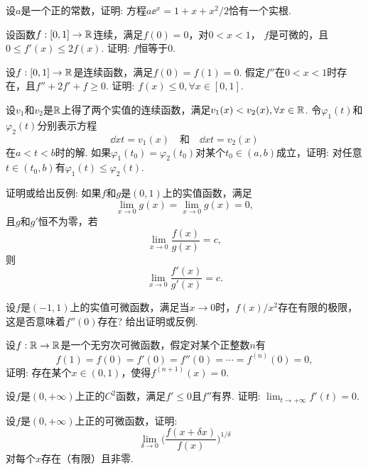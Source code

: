 \begin{example}
  设$a$是一个正的常数，证明: 方程$a\ee^x=1+x+x^2/2$恰有一个实根.
\end{example}

\begin{example}
  设函数$f:[0,1]\to\mathbb R$连续，满足$f(0)=0$，对$0<x<1$， $f$是可微的，且$0\le f'(x)\le2f(x)$. 证明: $f$恒等于0.
\end{example}

\begin{example}
  设$f:[0,1]\to\mathbb R$是连续函数，满足$f(0)=f(1)=0$. 假定$f''$在$0<x<1$时存在，且$f''+2f'+f\ge0$. 证明: $f(x)\le0,\forall x\in[0,1]$.
\end{example}

\begin{example}
  设$v_1$和$v_2$是$\mathbb R$上得了两个实值的连续函数，满足$v_1(x)<v_2(x),\forall x\in\mathbb R$. 令$\varphi_1(t)$和$\varphi_2(t)$分别表示方程
  \[ \dd xt=v_1(x)\quad \text{和}\quad \dd xt=v_2(x) \]
  在$a<t<b$时的解. 如果$\varphi_1(t_0)=\varphi_2(t_0)$对某个$t_0\in(a,b)$成立，证明: 对任意$t\in(t_0,b)$有$\varphi_1(t)\le\varphi_2(t)$.
\end{example}

\begin{example}
  证明或给出反例: 如果$f$和$g$是$(0,1)$上的实值函数，满足
  \[ \lim_{x\to0}g(x) = \lim_{x\to0}g(x)=0, \]
  且$g$和$g'$恒不为零，若
  \[ \lim_{x\to0}\frac{f(x)}{g(x)}=c, \]
  则
  \[ \lim_{x\to0}\frac{f'(x)}{g'(x)}=c. \]
\end{example}

\begin{example}
  设$f$是$(-1,1)$上的实值可微函数，满足当$x\to0$时，$f(x)/x^2$存在有限的极限，这是否意味着$f''(0)$存在? 给出证明或反例.
\end{example}

\begin{example}
  设$f:\mathbb R\to\mathbb R$是一个无穷次可微函数，假定对某个正整数$n$有
  \[ f(1)=f(0)=f'(0)=f''(0)=\cdots=f^{(n)}(0)=0, \]
  证明: 存在某个$x\in(0,1)$，使得$f^{(n+1)}(x)=0$.
\end{example}

\begin{example}
  设$f$是$(0,+\infty)$上正的$C^2$函数，满足$f'\le0$且$f''$有界. 证明: $\lim_{t\to+\infty}f'(t)=0$.
\end{example}

\begin{example}
  设$f$是$(0,+\infty)$上正的可微函数，证明:
  \[ \lim_{\delta\to0} \Big( \frac{f(x+\delta x)}{f(x)} \Big)^{1/\delta}
  \]
  对每个$x$存在（有限）且非零.
\end{example}

